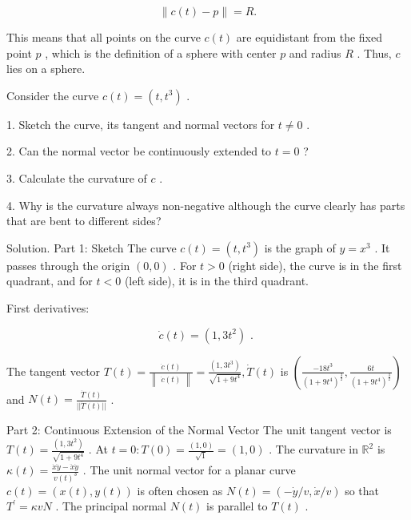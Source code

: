 \documentclass[10pt]{article}
\begin{document}
\[
\parallel c\left( t\right)  - p\parallel  = R.
\]

This means that all points on the curve \(c\left( t\right)\) are equidistant from the fixed point \(p\) , which is the definition of a sphere with center \(p\) and radius \(R\) . Thus, \(c\) lies on a sphere.

\begin{problem}[title=PROBLEM 5 (5 POINTS)]
Consider the curve \(c\left( t\right)  = \left( {t,{t}^{3}}\right)\) .

1. Sketch the curve, its tangent and normal vectors for \(t \neq  0\) .

2. Can the normal vector be continuously extended to \(t = 0\) ?

3. Calculate the curvature of \(c\) .

4. Why is the curvature always non-negative although the curve clearly has parts that are bent to different sides?
\end{problem}

Solution. Part 1: Sketch The curve \(c\left( t\right)  = \left( {t,{t}^{3}}\right)\) is the graph of \(y = {x}^{3}\) . It passes through the origin \(\left( {0,0}\right)\) . For \(t > 0\) (right side), the curve is in the first quadrant, and for \(t < 0\) (left side), it is in the third quadrant.

First derivatives:

\[
\dot{c}\left( t\right)  = \left( {1,3{t}^{2}}\right) \text{ . }
\]

The tangent vector \(T\left( t\right)  = \frac{\dot{c}\left( t\right) }{\begin{Vmatrix}\dot{c}\left( t\right) \end{Vmatrix}} = \frac{\left( 1,3{t}^{3}\right) }{\sqrt{1 + 9{t}^{4}}},\dot{T}\left( t\right)\) is \(\left( {\frac{-{18}{t}^{3}}{{\left( 1 + 9{t}^{4}\right) }^{\frac{3}{2}}},\frac{6t}{{\left( 1 + 9{t}^{4}\right) }^{\frac{3}{2}}}}\right)\) and \(N\left( t\right)  = \frac{\dot{T}\left( t\right) }{\left| \right| \dot{T}\left( t\right) \left| \right| }\) .

Part 2: Continuous Extension of the Normal Vector The unit tangent vector is \(T\left( t\right)  = \frac{\left( 1,3{t}^{2}\right) }{\sqrt{1 + 9{t}^{4}}}\) . At \(t = 0 : T\left( 0\right)  = \frac{\left( 1,0\right) }{\sqrt{1}} = \left( {1,0}\right)\) . The curvature in \({\mathbb{R}}^{2}\) is \(\kappa \left( t\right)  = \frac{\dot{x}\ddot{y} - \ddot{x}\dot{y}}{v{\left( t\right) }^{3}}\) . The unit normal vector for a planar curve \(c\left( t\right)  = \left( {x\left( t\right) ,y\left( t\right) }\right)\) is often chosen as \(N\left( t\right)  = \left( {-\dot{y}/v,\dot{x}/v}\right)\) so that \({T}^{\prime } = {\kappa vN}\) . The principal normal \(N\left( t\right)\) is parallel to \(T\left( t\right)\) .
\end{document}
